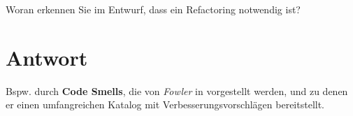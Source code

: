 Woran erkennen Sie im Entwurf, dass ein Refactoring notwendig ist?


\section*{Antwort}

Bspw. durch \textbf{Code Smells}, die von \textit{Fowler} in \cite{Fow99} vorgestellt werden, und zu denen er einen umfangreichen Katalog mit Verbesserungsvorschlägen bereitstellt.